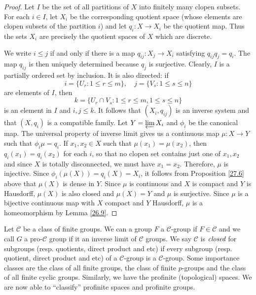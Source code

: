 \documentclass[12pt]{report}
\theoremstyle{definition}
\newcommand{\zz}{\mathbb{Z}}
\newcommand{\qq}{\mathbb{Q}}
\begin{document}
\begin{proof}
	Let $I$ be the set of all partitions of $X$ into finitely many clopen subsets. For each $i\in I$, let $X_i$ be the corresponding quotient space (whose elements are clopen subsets of the partition $i$) and let $q_i: X\to X_i$ be the quotient map. Thus the sets $X_i$ are precisely the quotient spaces of $X$ which are discrete.


	We write $i\leq j$ if and only if there is a map $q_{ij}: X_j\to X_i$ satisfying $q_{ij}q_j=q_i$. The map $q_{ij}$ is then uniquely determined because $q_j$ is surjective. Clearly, $I$ is a partially ordered set by inclusion. It is also directed: if $$i=\{U_r: 1\leq r\leq m\},\quad j=\{V_s: 1\leq s\leq n\}$$ are elements of $I$, then $$k=\{U_r\cap V_s: 1\leq r\leq m, 1\leq s\leq n\}$$ is an element in $I$ and $i,j\leq k$. It follows that $(X_i,q_{ij})$ is an inverse system and that $(X,q_i)$ is a compatible family. Let $Y=\varprojlim X_i$ and $\phi_i$ be the canonical map. The universal property of inverse limit gives us a continuous map $\mu: X\to Y$ such that $\phi_i \mu=q_i$. If $x_1,x_2\in X$ such that $\mu(x_1)=\mu(x_2)$, then $q_i(x_1)=q_i(x_2)$ for each $i$, so that no clopen set contains just one of $x_1,x_2$ and since $X$ is totally disconnected, we must have $x_1=x_2$. Therefore, $\mu$ is injective. Since $\phi_i(\mu(X))=q_i(X)=X_i$, it follows from Proposition \ref{27.6} above that $\mu(X)$ is dense in $Y$. Since $\mu$ is continuous and $X$ is compact and $Y$ is Hausdorff, $\mu(X)$ is also closed and $\mu(X)=Y$ and $\mu$ is surjective. Since $\mu$ is a bijective continuous map with $X$ compact and $Y$ Hausdorff, $\mu$ is a homeomorphism by Lemma \ref{26.9}.
\end{proof}


Let $\mathcal{C}$ be a class of finite groups. We can a group $F$ a $\mathcal{C}$-group if $F\in \mathcal{C}$ and we call $G$ a pro-$\mathcal{C}$ group if it an inverse limit of $\mathcal{C}$ groups. We say $\mathcal{C}$ is $\emph{closed}$ for subgroups (resp. quotients, direct product and etc) if every subgroup (resp. quotient, direct product and etc) of a $\mathcal{C}$-group is a $\mathcal{C}$-group. Some importance classes are the class of all finite groups, the class of finite $p$-groups and the class of all finite cyclic groups. Similarly, we have the profinite (topological) spaces. We are now able to ``classify'' profinite spaces and profinite groups.
\end{document}
